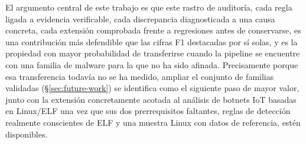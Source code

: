 El argumento central de este trabajo es que este rastro de
auditor\'ia, cada regla ligada a evidencia verificable, cada
discrepancia diagnosticada a una causa concreta, cada extensi\'on
comprobada frente a regresiones antes de conservarse, es una
contribuci\'on m\'as defendible que las cifras F1 destacadas por s\'i
solas, y es la propiedad con mayor probabilidad de transferirse cuando
la pipeline se encuentre con una familia de malware para la que no ha
sido afinada. Precisamente porque esa transferencia todav\'ia no se ha
medido, ampliar el conjunto de familias validadas
(\S\ref{sec:future-work}) se identifica como el siguiente paso de
mayor valor, junto con la extensi\'on concretamente acotada al
an\'alisis de botnets IoT basadas en Linux/ELF una vez que sus dos
prerrequisitos faltantes, reglas de detecci\'on realmente conscientes
de ELF y una muestra Linux con datos de referencia, est\'en
disponibles.
